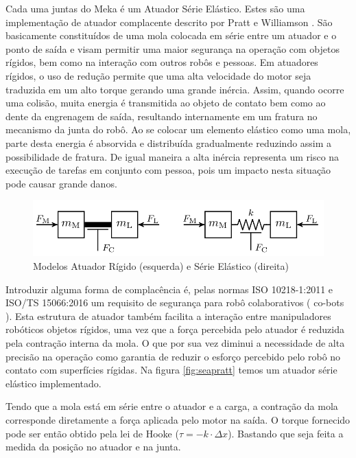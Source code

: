 Cada uma juntas do Meka é um Atuador Série Elástico. Estes são uma implementação de atuador complacente descrito por Pratt e Williamson \cite{pratt1995series}. São basicamente constituídos de uma mola colocada em série entre um atuador e o ponto de saída e visam permitir uma maior segurança na operação com objetos rígidos, bem como na interação com outros robôs e pessoas. Em atuadores rígidos, o uso de redução permite que uma alta velocidade do motor seja traduzida em um alto torque gerando uma grande inércia. Assim, quando ocorre uma colisão, muita energia é transmitida ao objeto de contato bem como ao dente da engrenagem de saída, resultando internamente em um fratura no mecanismo da junta do robô. Ao se colocar um elemento elástico como uma mola, parte desta energia é absorvida e distribuída gradualmente reduzindo assim a possibilidade de fratura. De igual maneira a alta inércia representa um risco na execução de tarefas em conjunto com pessoa, pois um impacto nesta situação pode causar grande danos.

\begin{figure}[H]
    \centering
    \includegraphics[width=0.8\linewidth]{tex/figs/sea_ulrich.png}
    \caption{Modelos Atuador Rígido (esquerda) e Série Elástico (direita) \cite{Konigorski2012ModelSea}}
    \label{fig:sea}
\end{figure}

Introduzir alguma forma de complacência é, pelas normas ISO 10218-1:2011 e ISO/TS 15066:2016 um requisito de segurança para robô colaborativos ( co-bots ). Esta estrutura de atuador também facilita a interação entre manipuladores robóticos objetos rígidos, uma vez que a força percebida pelo atuador é reduzida pela contração interna da mola. O que por sua vez diminui a necessidade de alta precisão na operação como garantia de reduzir o esforço percebido pelo robô no contato com superfícies rígidas. Na figura \ref{fig:seapratt} temos um atuador série elástico implementado.

Tendo que a mola está em série entre o atuador e a carga, a contração da mola corresponde diretamente a força aplicada pelo motor na saída. O torque fornecido pode ser então obtido pela lei de Hooke ($\tau = -k\cdot \Delta x$). Bastando que seja feita a medida da posição no atuador e na junta.

